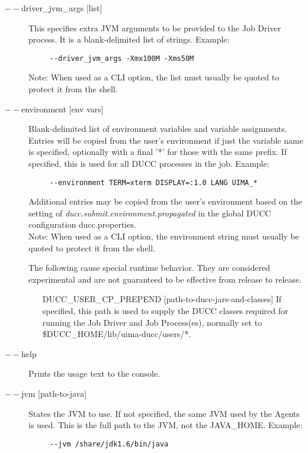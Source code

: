 \begin{description}
           \item[$--$driver\_jvm\_args {[list]} ]
             This specifies extra JVM arguments to be provided to the Job Driver process. It is a blank-delimited 
             list of strings. Example: 
             \begin{verbatim}
     --driver_jvm_args -Xmx100M -Xms50M
             \end{verbatim}
             Note: When used as a CLI option, the list must usually be
             quoted to protect it from the shell.

           \item[$--$environment {[env vars]}] Blank-delimited list of environment variables and
             variable assignments. 
             Entries will be copied from the user's environment if just the variable name is
             specified, optionally with a final '*' for those with the same prefix.
             If specified, this is used for all DUCC processes in the job. Example:
             \begin{verbatim}
     --environment TERM=xterm DISPLAY=:1.0 LANG UIMA_*
             \end{verbatim}
             Additional entries may be copied from the user's environment based on the setting of
             {\em ducc.submit.environment.propagated}
             in the global DUCC configuration ducc.properties.
             \\Note: When used as a CLI option, the environment string must usually be
             quoted to protect it from the shell.

   
             The following cause special runtime behavior. 
             They are considered experimental and are not guaranteed 
             to be effective from release to release.
             
  \begin{enumerate}
    \item[DUCC\_USER\_CP\_PREPEND {[path-to-ducc-jars-and-classes]}  ]
    If specified, this path is used to supply the DUCC classes required for running
    the Job Driver and Job Process(es), normally set to \$DUCC\_HOME/lib/uima-ducc/users/*.
  \end{enumerate}


           \item[$--$help ]
             Prints the usage text to the console. 

           \item[$--$jvm {[path-to-java]}  ]
             States the JVM to use. If not specified, the same JVM used by the Agents is used.  This is
             the full path to the JVM, not the JAVA\_HOME.
             Example: 
             \begin{verbatim}
     --jvm /share/jdk1.6/bin/java
             \end{verbatim}
             

\end{description}
